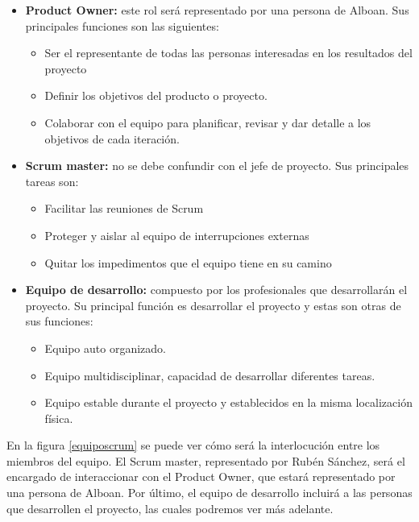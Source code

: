 \begin{itemize}
	\item \textbf{Product Owner:} este rol será representado por una persona de Alboan. Sus principales funciones son las siguientes:
	\begin{itemize}
		\item Ser el representante de todas las personas interesadas en los resultados del proyecto
		\item Definir los objetivos del producto o proyecto.
		\item Colaborar con el equipo para planificar, revisar y dar detalle a los objetivos de cada iteración.
	\end{itemize}
	\item \textbf{Scrum master:} no se debe confundir con el jefe de proyecto. Sus principales tareas son:
	\begin{itemize}
		\item Facilitar las reuniones de Scrum
		\item Proteger y aislar al equipo de interrupciones externas
		\item Quitar los impedimentos que el equipo tiene en su camino
	\end{itemize}
	\item \textbf{Equipo de desarrollo:} compuesto por los profesionales que desarrollarán el proyecto. Su principal función es desarrollar el proyecto y estas son otras de sus funciones:
	\begin{itemize}
		\item Equipo auto organizado.
		\item Equipo multidisciplinar, capacidad de desarrollar diferentes tareas.
		\item Equipo estable durante el proyecto y establecidos en la misma localización física.
	\end{itemize}

\end{itemize}

En la figura \ref{equiposcrum} se puede ver cómo será la interlocución entre los miembros del equipo. El Scrum master, representado por Rubén Sánchez, será el encargado de interaccionar con el Product Owner, que estará representado por una persona de Alboan. Por último, el equipo de desarrollo incluirá a las personas que desarrollen el proyecto, las cuales podremos ver más adelante.


